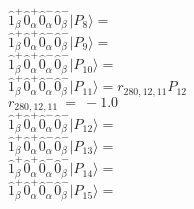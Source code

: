 \documentclass[14pt]{article}
\begin{document}
    $ \hat{1}_{\beta}^{+}\hat{0}_{\alpha}^{+}\hat{0}_{\alpha}^{-}\hat{0}_{\beta}^{-} \vert{P_{8}}\rangle =  $ \\ 
    $ \hat{1}_{\beta}^{+}\hat{0}_{\alpha}^{+}\hat{0}_{\alpha}^{-}\hat{0}_{\beta}^{-} \vert{P_{9}}\rangle =  $ \\ 
    $ \hat{1}_{\beta}^{+}\hat{0}_{\alpha}^{+}\hat{0}_{\alpha}^{-}\hat{0}_{\beta}^{-} \vert{P_{10}}\rangle =  $ \\ 
    $ \hat{1}_{\beta}^{+}\hat{0}_{\alpha}^{+}\hat{0}_{\alpha}^{-}\hat{0}_{\beta}^{-} \vert{P_{11}}\rangle = {r}_{280,12,11}P_{12} $ \\ 
    ${r}_{280,12,11}\ =\ -1.0 $ \\ 
    $ \hat{1}_{\beta}^{+}\hat{0}_{\alpha}^{+}\hat{0}_{\alpha}^{-}\hat{0}_{\beta}^{-} \vert{P_{12}}\rangle =  $ \\ 
    $ \hat{1}_{\beta}^{+}\hat{0}_{\alpha}^{+}\hat{0}_{\alpha}^{-}\hat{0}_{\beta}^{-} \vert{P_{13}}\rangle =  $ \\ 
    $ \hat{1}_{\beta}^{+}\hat{0}_{\alpha}^{+}\hat{0}_{\alpha}^{-}\hat{0}_{\beta}^{-} \vert{P_{14}}\rangle =  $ \\ 
    $ \hat{1}_{\beta}^{+}\hat{0}_{\alpha}^{+}\hat{0}_{\alpha}^{-}\hat{0}_{\beta}^{-} \vert{P_{15}}\rangle =  $ \\ 
    
\end{document}
